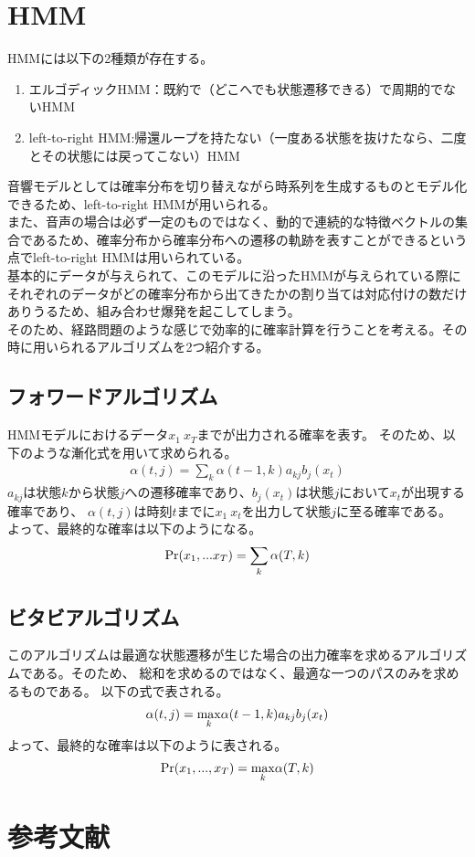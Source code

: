 \documentclass[dvipdfmx,titlepage, a4paper]{jsarticle}%
\begin{document}
\section{HMM}
HMMには以下の2種類が存在する。
\begin{enumerate}
	\item エルゴディックHMM：既約で（どこへでも状態遷移できる）で周期的でないHMM
	\item left-to-right HMM:帰還ループを持たない（一度ある状態を抜けたなら、二度とその状態には戻ってこない）HMM
\end{enumerate}
音響モデルとしては確率分布を切り替えながら時系列を生成するものとモデル化できるため、left-to-right HMMが用いられる。\\
また、音声の場合は必ず一定のものではなく、動的で連続的な特徴ベクトルの集合であるため、確率分布から確率分布への遷移の軌跡を表すことができるという点でleft-to-right HMMは用いられている。\\
基本的にデータが与えられて、このモデルに沿ったHMMが与えられている際にそれぞれのデータがどの確率分布から出てきたかの割り当ては対応付けの数だけありうるため、組み合わせ爆発を起こしてしまう。\\
そのため、経路問題のような感じで効率的に確率計算を行うことを考える。その時に用いられるアルゴリズムを2つ紹介する。
\subsection{フォワードアルゴリズム}
HMMモデルにおけるデータ$x_{1} ~ x_{T}$までが出力される確率を表す。
そのため、以下のような漸化式を用いて求められる。
\begin{eqnarray*}
	\alpha(t, j) = \sum_{k} \alpha(t - 1, k)a_{kj}b_{j}(x_{t})
\end{eqnarray*}
$a_{kj}$は状態$k$から状態$j$への遷移確率であり、$b_{j}(x_{t})$は状態$j$において$x_{t}$が出現する確率であり、
$\alpha(t, j)$は時刻$t$までに$x_{1} ~ x_{t}$を出力して状態$j$に至る確率である。
よって、最終的な確率は以下のようになる。
\begin{eqnarray*}
	{\rm Pr}(x_{1}, ...x_{T}) = \sum_{k} \alpha(T, k)
\end{eqnarray*}
\subsection{ビタビアルゴリズム}
このアルゴリズムは最適な状態遷移が生じた場合の出力確率を求めるアルゴリズムである。そのため、
総和を求めるのではなく、最適な一つのパスのみを求めるものである。
以下の式で表される。
\begin{eqnarray*}
	\alpha(t, j) = \underset{k}{\rm max} \alpha(t - 1, k)a_{kj}b_{j}(x_{t})
\end{eqnarray*}
よって、最終的な確率は以下のように表される。
\begin{eqnarray*}
	{\rm Pr}(x_{1}, ..., x_{T}) = \underset{k}{\rm max} \alpha(T, k)
\end{eqnarray*}
\section{参考文献}
\small

\nocite{*}

\end{document}
